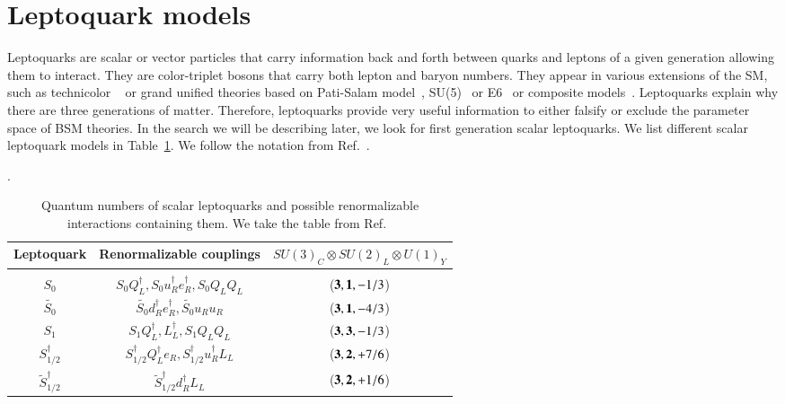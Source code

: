 \newpage
\section{Leptoquark models}

Leptoquarks are scalar or vector particles that carry information back and forth between quarks and leptons of a given generation allowing them  to interact. They are color-triplet bosons that carry both lepton and baryon numbers. They appear in various extensions of the SM, such as technicolor ~\cite{technicolor2, technicolor3,LQ2} or grand unified theories based on Pati-Salam model~\cite{LQ3}, SU(5)~\cite{LQ4} or E6~\cite{superstring_e6} or composite models~\cite{LQ1}. Leptoquarks explain why there are three generations of matter. Therefore, leptoquarks provide very useful information to either falsify or exclude the parameter space of BSM theories. In the search we will be describing later, we look for first generation scalar leptoquarks. We list different scalar leptoquark models in Table~\ref{tab:scalarLeptoQuark}. We follow the notation from Ref.~\cite{pdg1}.



\begin{table}[h]
\begin{center}
\caption{Quantum numbers of scalar leptoquarks and possible renormalizable interactions
containing them. We take the table from Ref.~\cite{LQLHC}}.
 \begin{tabular}{||c c c||}
 \hline
 Leptoquark & Renormalizable couplings & $SU(3)_{C} \otimes SU(2)_L \otimes U(1)_Y$ \\ [0.5ex]
 \hline\hline
                 &       &  \\
                  $S_{0}$     &$S_{0}Q_{L}^{\dagger}, S_{0}u_{R}^{\dagger}e_{R}^{\dagger}, S_{0}Q_{L}Q_{L}$   &  (${\bf 3},{\bf 1},-1/3$)  \\
           $\tilde{S_{0}} $   & $\tilde{S_{0}}d_{R}^{\dagger}e_{R}^{\dagger}, \tilde{S_{0}}u_{R}u_{R}$             &  (${\bf 3},{\bf 1},-4/3$) \\
                   $S_{1} $   & $S_{1}Q_{L}^{\dagger},L_{L}^{\dagger}, S_{1}Q_{L}Q_{L}$             &  (${\bf 3},{\bf  3}, -1/3$) \\  
        $S^{\dagger}_{1/2} $  & $S_{1/2}^{\dagger}Q_{L}^{\dagger}e_{R}, S_{1/2}^{\dagger}u_{R}^{\dagger}L_{L} $             &  (${\bf 3},{\bf  2}, +7/6$) \\  
  $\tilde{S}^{\dagger}_{1/2}$ & $\tilde{S}_{1/2}^{\dagger}d_{R}^{\dagger}L_{L}$             &  (${\bf 3},{\bf  2}, +1/6$) \\  \hline
  

\end{tabular}
\label{tab:scalarLeptoQuark}
\end{center}
\end{table}












